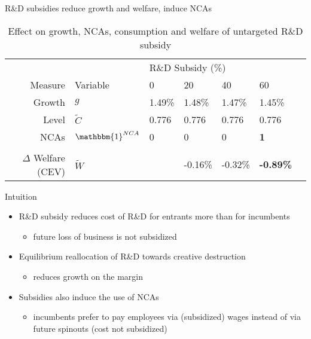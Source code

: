 \documentclass[english,usenames,dvipsnames]{beamer}
\begin{document}
\begin{frame}{R\&D subsidies reduce growth and welfare, induce NCAs}\label{RDsubsidy_table}
		\begin{table}
			\centering
			\small
			\caption*{Effect on growth, NCAs, consumption and welfare of untargeted R\&D subsidy}
			\begin{tabular}{rllllll}
				\toprule \toprule
				 &  & \multicolumn{4}{l}{R\&D Subsidy (\%)} \vspace{3pt} \tabularnewline
				Measure &Variable & 0 & 20 & 40 & 60 \tabularnewline
				\midrule
				Growth & $g$ & 1.49\% & 1.48\% & 1.47\% & 1.45\% \tabularnewline
				Level & $\tilde{C}$  & 0.776 &  0.776 & 0.776 & 0.776 \tabularnewline 
				NCAs & $\mathbbm{1}^{NCA}$ & 0 & 0 & 0 & \alert{\textbf{1}} \tabularnewline
				\tabularnewline
				$\Delta$ Welfare (CEV) & $\tilde{W}$  &  & -0.16\% & -0.32\% & \alert{\textbf{-0.89\%}} \tabularnewline
				\bottomrule
			\end{tabular}
		\end{table}
		\hyperlink{rd_subsidies:decomposition_growth_decrease}{}
		\hyperlink{plots:rd_subsidies1}{}
		\hyperlink{plots:rd_subsidies2}{}
\end{frame}

\begin{frame}{Intuition}
	\begin{itemize}
		\item <+-> R\&D subsidy reduces cost of R\&D for entrants more than for incumbents
		\begin{itemize}
			\item future loss of business is not subsidized
		\end{itemize}
		\medskip
		\item <+-> Equilibrium reallocation of R\&D towards creative destruction
		\begin{itemize}
			\item reduces growth on the margin
		\end{itemize}
		\medskip
		\item <+-> Subsidies also induce the use of NCAs
		\begin{itemize}
			\item incumbents prefer to pay employees via (subsidized) wages instead of via future spinouts (cost not subsidized)
		\end{itemize}
	\end{itemize}
\end{frame}
\end{document}
